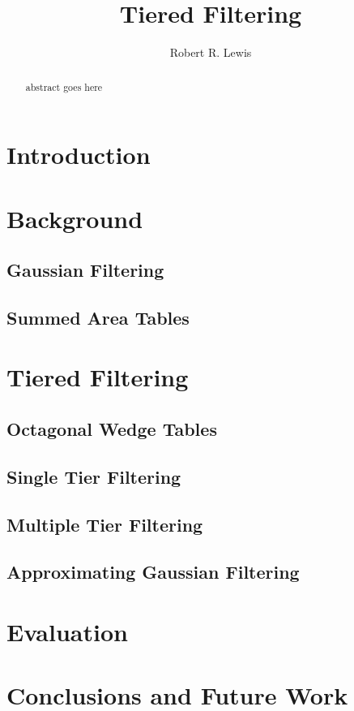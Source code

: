 \documentclass{llncs}
\begin{document}
\pagestyle{empty}

\mainmatter
\title{Tiered Filtering}

\author{Robert R. Lewis}

\maketitle
\begin{abstract}
abstract goes here
\end{abstract}

\section{Introduction}

\section{Background}

\subsection{Gaussian Filtering}

\subsection{Summed Area Tables}

\section{Tiered Filtering}

\subsection{Octagonal Wedge Tables}

\subsection{Single Tier Filtering}

\subsection{Multiple Tier Filtering}

\subsection{Approximating Gaussian Filtering}

\section{Evaluation}

\section{Conclusions and Future Work}



\end{document}
